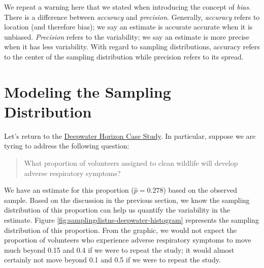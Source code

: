 \documentclass[
]{book}
\theoremstyle{plain}
\theoremstyle{mydefn}
\theoremstyle{myexmpl}
\theoremstyle{remark}
\begin{document}
\begin{rmdwarning}
We repeat a warning here that we stated when introducing the concept of \emph{bias}. There is a difference between \emph{accuracy} and \emph{precision}. Generally, \emph{accuracy} refers to location (and therefore bias); we say an estimate is accurate accurate when it is unbiased. \emph{Precision} refers to the variability; we say an estimate is more precise when it has less variability. With regard to sampling distributions, accuracy refers to the center of the sampling distribution while precision refers to its spread.
\end{rmdwarning}

\hypertarget{modeling-the-sampling-distribution}{%
\section{Modeling the Sampling Distribution}\label{modeling-the-sampling-distribution}}

Let's return to the \protect\hyperlink{CaseDeepwater}{Deepwater Horizon Case Study}. In particular, suppose we are tyring to address the following question:

\begin{quote}
What proportion of volunteers assigned to clean wildlife will develop adverse respiratory symptoms?
\end{quote}

We have an estimate for this proportion (\(\widehat{p} = 0.278\)) based on the observed sample. Based on the discussion in the previous section, we know the sampling distribution of this proportion can help us quantify the variability in the estimate. Figure \ref{fig:samplingdistns-deepwater-histogram} represents the sampling distribution of this proportion. From the graphic, we would not expect the proportion of volunteers who experience adverse respiratory symptoms to move much beyond 0.15 and 0.4 if we were to repeat the study; it would almost certainly not move beyond 0.1 and 0.5 if we were to repeat the study.
\end{document}
